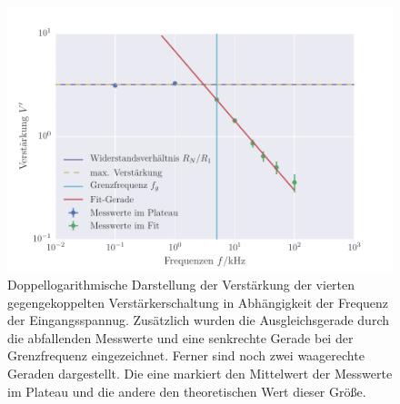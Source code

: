 \FloatBarrier
\begin{figure}[!h]
\centering
\includegraphics[scale=1]{../Grafiken/Gegengekoppelter_Verstaerker_4.pdf}
\caption{Doppellogarithmische Darstellung der Verstärkung der vierten gegengekoppelten Verstärkerschaltung in Abhängigkeit der Frequenz der Eingangsspannug. Zusätzlich wurden die Ausgleichsgerade
	durch die abfallenden Messwerte und eine senkrechte Gerade bei der Grenzfrequenz eingezeichnet. Ferner sind noch  zwei waagerechte Geraden dargestellt. Die eine markiert den Mittelwert der Messwerte im Plateau und die  andere
	den theoretischen Wert dieser Größe.\label{fig:gegengekoppelter_verstaerker_4}}
\end{figure}
\FloatBarrier